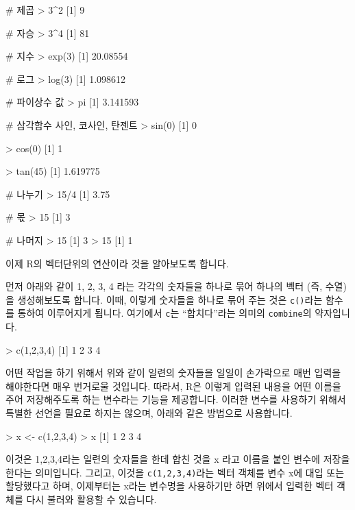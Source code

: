 \documentclass[tutorial.tex]{subfiles}
\begin{document}
\begin{Schunk}
	\begin{Soutput}
# 제곱 
> 3^2
[1] 9

# 자승
> 3^4
[1] 81

# 지수 
> exp(3)
[1] 20.08554
 
# 로그 
> log(3)
[1] 1.098612
 
# 파이상수 값 
> pi
[1] 3.141593

# 삼각함수 사인, 코사인, 탄젠트  
> sin(0)
[1] 0

> cos(0)
[1] 1

> tan(45)
[1] 1.619775
 
# 나누기
> 15/4
[1] 3.75

# 몫 
> 15 %/% 4
[1] 3

# 나머지 
> 15 %% 4
[1] 3
> 15 %% 2
[1] 1
 
\end{Soutput}
\end{Schunk}

이제 R의 벡터단위의 연산이라 것을 알아보도록 합니다. 

먼저 아래와 같이 1, 2, 3, 4 라는 각각의 숫자들을 하나로 묶어 하나의 벡터 (즉, 수열)을 생성해보도록 합니다. 
이때, 이렇게 숫자들을 하나로 묶어 주는 것은 \texttt{c()}라는 함수를 통하여 이루어지게 됩니다.
여기에서 \texttt{c}는 ``합치다''라는 의미의 \texttt{combine}의 약자입니다.

\begin{Schunk}
\begin{Soutput}
> c(1,2,3,4)
[1] 1 2 3 4
\end{Soutput}
\end{Schunk}

어떤 작업을 하기 위해서 위와 같이 일련의 숫자들을 일일이 손가락으로 매번 입력을 해야한다면 매우 번거로울 것입니다.
따라서, R은 이렇게 입력된 내용을 어떤 이름을 주어 저장해주도록 하는 변수라는 기능을 제공합니다. 
이러한 변수를 사용하기 위해서 특별한 선언을 필요로 하지는 않으며, 아래와 같은 방법으로 사용합니다. 

\begin{Schunk}
\begin{Soutput}
> x <- c(1,2,3,4)
> x
[1] 1 2 3 4
\end{Soutput}
\end{Schunk}

이것은 1,2,3,4라는 일련의 숫자들을 한데 합친 것을 x 라고 이름을 붙인 변수에 저장을 한다는 의미입니다.
그리고, 이것을 \texttt{c(1,2,3,4)}라는 벡터 객체를 변수 x에 대입 또는 할당했다고 하며, 이제부터는 x라는 변수명을 사용하기만 하면 위에서 입력한 벡터 객체를 다시 불러와 활용할 수 있습니다.
\end{document}
